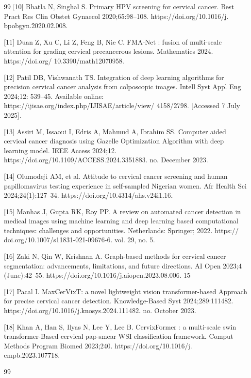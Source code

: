 \documentclass{svjour3}
\begin{document}
\begin{thebibliography}{99}
 [10] Bhatla N, Singhal S. Primary HPV screening for cervical cancer. Best Pract Res Clin Obstet Gynaecol 2020;65:98–108. https://doi.org/10.1016/j. bpobgyn.2020.02.008.

 [11] Duan Z, Xu C, Li Z, Feng B, Nie C. FMA-Net : fusion of multi-scale attention for grading cervical precancerous lesions. Mathematics 2024. https://doi.org/ 10.3390/math12070958.

 [12] Patil DB, Vishwanath TS. Integration of deep learning algorithms for precision cervical cancer analysis from colposcopic images. Intell Syst Appl Eng 2024;12: 539–45. Available online: https://ijisae.org/index.php/IJISAE/article/view/ 4158/2798. [Accessed 7 July 2025].

 [13] Assiri M, Issaoui I, Edris A, Mahmud A, Ibrahim SS. Computer aided cervical cancer diagnosis using Gazelle Optimization Algorithm with deep learning model. IEEE Access 2024;12. https://doi.org/10.1109/ACCESS.2024.3351883. no. December 2023.

 [14] Olumodeji AM, et al. Attitude to cervical cancer screening and human papillomavirus testing experience in self-sampled Nigerian women. Afr Health Sci 2024;24(1):127–34. https://doi.org/10.4314/ahs.v24i1.16.

 [15] Manhas J, Gupta RK, Roy PP. A review on automated cancer detection in medical images using machine learning and deep learning based computational techniques: challenges and opportunities. Netherlands: Springer; 2022. https:// doi.org/10.1007/s11831-021-09676-6. vol. 29, no. 5.

 [16] Zaki N, Qin W, Krishnan A. Graph-based methods for cervical cancer segmentation: advancements, limitations, and future directions. AI Open 2023;4 (June):42–55. https://doi.org/10.1016/j.aiopen.2023.08.006. 15

 [17] Pacal I. MaxCerVixT: a novel lightweight vision transformer-based Approach for precise cervical cancer detection. Knowledge-Based Syst 2024;289:111482. https://doi.org/10.1016/j.knosys.2024.111482. no. October 2023.

 [18] Khan A, Han S, Ilyas N, Lee Y, Lee B. CervixFormer : a multi-scale swin transformer-Based cervical pap-smear WSI classification framework. Comput Methods Program Biomed 2023;240. https://doi.org/10.1016/j. cmpb.2023.107718.

 \begin{thebibliography}{99}


\end{thebibliography}
\end{thebibliography}
\end{document}
